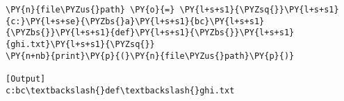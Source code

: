 \begin{Verbatim}[label=\makebox{\href{https://github.com/unipi-physics-labs/lab1-notes/tree/main/snippy/dos_path_escape.py}{https://github.com/.../dos\_path\_escape.py}},commandchars=\\\{\}]
\PY{n}{file\PYZus{}path} \PY{o}{=} \PY{l+s+s1}{\PYZsq{}}\PY{l+s+s1}{c:}\PY{l+s+se}{\PYZbs{}a}\PY{l+s+s1}{bc}\PY{l+s+s1}{\PYZbs{}}\PY{l+s+s1}{def}\PY{l+s+s1}{\PYZbs{}}\PY{l+s+s1}{ghi.txt}\PY{l+s+s1}{\PYZsq{}}
\PY{n+nb}{print}\PY{p}{(}\PY{n}{file\PYZus{}path}\PY{p}{)}

[Output]
c:bc\textbackslash{}def\textbackslash{}ghi.txt
\end{Verbatim}
